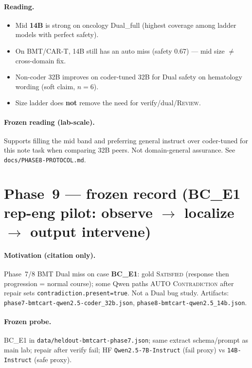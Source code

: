\documentclass[11pt,a4paper]{article}
\newcommand{\sat}{\textsc{Satisfied}}
\newcommand{\con}{\textsc{Contradiction}}
\newcommand{\rev}{\textsc{Review}}
\begin{document}
\paragraph{Reading.}
\begin{itemize}
  \item Mid \textbf{14B} is strong on oncology Dual\_full (highest coverage among ladder models with perfect safety).
  \item On BMT/CAR-T, 14B still has an auto miss (safety 0.67) --- mid size $\neq$ cross-domain fix.
  \item Non-coder 32B improves on coder-tuned 32B for Dual safety on hematology wording (soft claim, $n=6$).
  \item Size ladder does \textbf{not} remove the need for verify/dual/\rev{}.
\end{itemize}

\paragraph{Frozen reading (lab-scale).}
Supports filling the mid band and preferring general instruct over coder-tuned for this note task when comparing 32B peers.
Not domain-general assurance. See \texttt{docs/PHASE8-PROTOCOL.md}.

\section{Phase~9 --- frozen record (BC\_E1 rep-eng pilot: observe $\rightarrow$ localize $\rightarrow$ output intervene)}

\paragraph{Motivation (citation only).}
Phase~7/8 BMT Dual miss on case \textbf{BC\_E1}: gold \sat{} (response then progression = normal course); some Qwen paths AUTO \con{} after repair sets \texttt{contradiction.present=true}.
Not a Dual bug study. Artifacts: \texttt{phase7-bmtcart-qwen2.5-coder\_32b.json}, \texttt{phase8-bmtcart-qwen2.5\_14b.json}.

\paragraph{Frozen probe.}
BC\_E1 in \texttt{data/heldout-bmtcart-phase7.json}; same extract schema/prompt as main lab; repair after verify fail; HF \texttt{Qwen2.5-7B-Instruct} (fail proxy) vs \texttt{14B-Instruct} (safe proxy).
\end{document}
